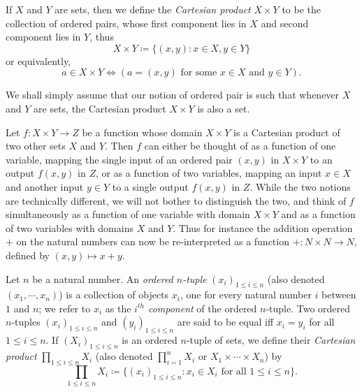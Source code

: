 \begin{definition}\label{definition 3.5.2}
If \(X\) and \(Y\) are sets, then we define the \emph{Cartesian product} \(X \times Y\) to be the collection of ordered pairs, whose first component lies in \(X\) and second component lies in \(Y\), thus
\[
    X \times Y \coloneqq \{(x, y) : x \in X, y \in Y\}
\]
or equivalently,
\[
    a \in X \times Y \iff (a = (x, y) \text{ for some } x \in X \text{ and } y \in Y).
\]
\end{definition}

\begin{remark}
We shall simply assume that our notion of ordered pair is such that whenever \(X\) and \(Y\) are sets, the Cartesian product \(X \times Y\) is also a set.
\end{remark}

Let \(f : X \times Y \to Z\) be a function whose domain \(X \times Y\) is a Cartesian product of two other sets \(X\) and \(Y\).
Then \(f\) can either be thought of as a function of one variable, mapping the single input of an ordered pair \((x, y)\) in \(X \times Y\) to an output \(f(x, y)\) in \(Z\), or as a function of two variables, mapping an input \(x \in X\) and another input \(y \in Y\) to a single output \(f(x, y)\) in \(Z\).
While the two notions are technically different, we will not bother to distinguish the two, and think of \(f\) simultaneously as a function of one variable with domain \(X \times Y\) and as a function of two variables with domains \(X\) and \(Y\).
Thus for instance the addition operation \(+\) on the natural numbers can now be re-interpreted as a function \(+ : N \times N \to N\), defined by \((x, y) \mapsto x + y\).

\begin{definition}\label{definition 3.5.3}
Let \(n\) be a natural number.
An \emph{ordered \(n\)-tuple} \((x_i)_{1 \leq i \leq n}\) (also denoted \((x_1, \cdots, x_n)\)) is a collection of objects \(x_i\), one for every natural number \(i\) between \(1\) and \(n\);
we refer to \(x_i\) as the \emph{\(i^{th}\) component} of the ordered \(n\)-tuple.
Two ordered \(n\)-tuples \((x_i)_{1 \leq i \leq n}\) and \((y_i)_{1 \leq i \leq n}\) are said to be equal iff \(x_i = y_i\) for all \(1 \leq i \leq n\).
If \((X_i)_{1 \leq i \leq n}\) is an ordered \(n\)-tuple of sets, we define their \emph{Cartesian product} \(\prod_{1 \leq i \leq n} X_i\) (also denoted \(\prod_{i=1}^n X_i\) or \(X_1 \times \cdots \times X_n\)) by
\[
    \prod_{1 \leq i \leq n} X_i \coloneqq \{(x_i)_{1 \leq i \leq n} : x_i \in X_i \text{ for all } 1 \leq i \leq n\}.
\]
\end{definition}

